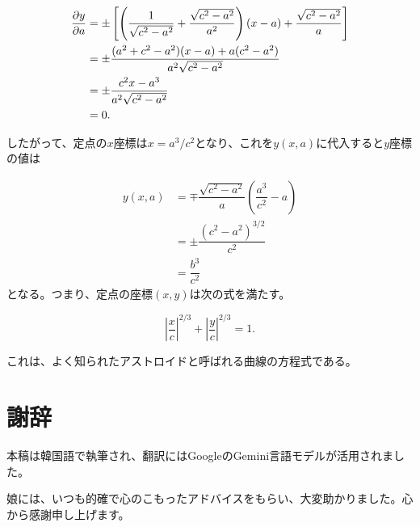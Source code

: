 \documentclass[twocolumn]{article}
\begin{document}
	$$ \begin{aligned}
		{\frac{\partial y}{\partial a}} &= \pm\left[\left( \dfrac{1}{\sqrt{c^2-a^2}}+\dfrac{\sqrt{c^2-a^2}}{a^2}\right) (x-a) + \dfrac{\sqrt{c^2-a^2}}{a} \right]\\
		&= \pm \dfrac{(a^2+c^2-a^2)(x-a)+a(c^2-a^2)}{a^2\sqrt{c^2-a^2}}\\
		&= \pm \dfrac{c^2 x - a^3}{a^2 \sqrt{c^2 - a^2}}\\
		&= 0.
	\end{aligned}
	$$
	
	したがって、定点の$x$座標は$x = a^3/c^2$となり、これを$y(x, a)$に代入すると$y$座標の値は
	
	$$ \begin{aligned}
		y(x, a) &= \mp \dfrac{\sqrt{c^2-a^2}}{a}\left(\dfrac{a^3}{c^2}-a\right)\\
		& = \pm \dfrac{\left( c^2- a^2 \right)^{3/2}}{c^2}\\
		& = \dfrac{b^3}{c^2}
	\end{aligned}
	$$
%	
	となる。つまり、定点の座標$(x, y)$は次の式を満たす。
	
	$$ \left|\dfrac{x}{c}\right|^{2/3} + \left|\dfrac{y}{c}\right|^{2/3} = 1. $$
	
	これは、よく知られたアストロイドと呼ばれる曲線の方程式である。
	
	
	\section*{謝辞}
	本稿は韓国語で執筆され、翻訳にはGoogleのGemini言語モデルが活用されました。
	
	\medskip
	
	\noindent
	娘には、いつも的確で心のこもったアドバイスをもらい、大変助かりました。心から感謝申し上げます。
	
\end{document}
